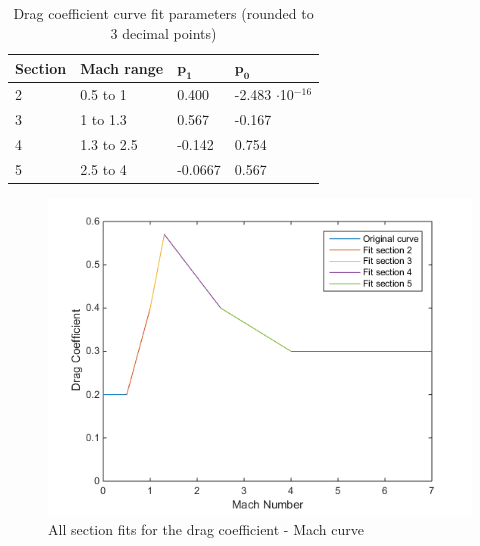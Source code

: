 \begin{table}[!ht]
\begin{center}
\caption{Drag coefficient curve fit parameters (rounded to 3 decimal points)}
\label{tab:dragCoeffPara}
\begin{tabular}{|l|l||l|l|}
\hline 
\textbf{Section}  & \textbf{Mach range}& $\mathbf{p_{1}}$ & $\mathbf{p_{0}}$ \\ \hline 
2  & 0.5 to 1  & 0.400 & -2.483 $\cdot$10$^{-16}$  \\ \hline
3  & 1 to 1.3  & 0.567 & -0.167  \\ \hline
4  &  1.3 to 2.5 & -0.142 & 0.754 \\ \hline
5  &  2.5 to 4 & -0.0667 & 0.567 \\ \hline
\end{tabular}
\end{center}
\end{table}



\begin{figure}[!ht]
\centering
\includegraphics[width=1.0\textwidth]{figures/software/dragCoeffFit.png}
\caption{All section fits for the drag coefficient - Mach curve}
\label{fig:dragCoeffFit}
\end{figure}